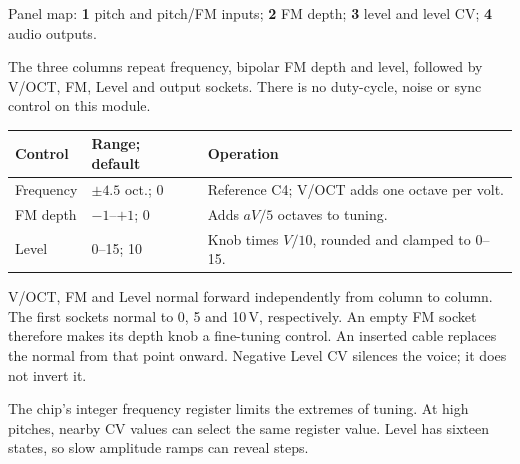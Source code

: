 Panel map: \textbf{1} pitch and pitch/FM inputs;
\textbf{2} FM depth;
\textbf{3} level and level CV;
\textbf{4} audio outputs.

The three columns repeat frequency, bipolar FM depth and level, followed by
V/OCT, FM, Level and output sockets. There is no duty-cycle, noise or sync
control on this module.

\begin{tabularx}{\textwidth}{@{}l l X@{}}
\toprule Control & Range; default & Operation \\\midrule
Frequency & $\pm4.5$ oct.; 0 & Reference C4; V/OCT adds one octave per volt. \\
FM depth & $-1$--$+1$; 0 & Adds $aV/5$ octaves to tuning. \\
Level & 0--15; 10 & Knob times $V/10$, rounded and clamped to 0--15. \\
\bottomrule
\end{tabularx}

V/OCT, FM and Level normal forward independently from column to column.
The first sockets normal to 0, 5 and 10\,V, respectively. An empty FM socket
therefore makes its depth knob a fine-tuning control. An inserted cable
replaces the normal from that point onward. Negative Level CV silences the
voice; it does not invert it.

The chip's integer frequency register limits the extremes of tuning.
At high pitches, nearby CV values can select the same register value.
Level has sixteen states, so slow amplitude ramps can reveal steps.
